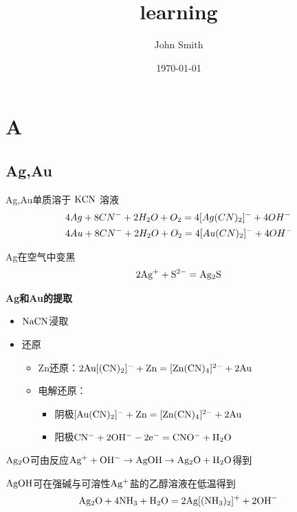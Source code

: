 \documentclass[UTF8]{article}
\title{learning}
\author{John Smith}
\date{\today}
\begin{document}
\section{A}

\subsection{Ag,Au}

Ag,Au单质溶于 $ \rm K CN$ 溶液
\begin{equation}
    \begin{aligned}
        \rm \nonumber
         & 4Ag+8 {CN}^{-} +2H_{2}O+O_{2} = 4[Ag(CN)_{2}]^{-} +4OH^{-} \\
         & 4Au+8 {CN}^{-} +2H_{2}O+O_{2} = 4[Au(CN)_{2}]^{-} +4OH^{-}
    \end{aligned}
\end{equation}

Ag在空气中变黑
\begin{equation}
    \begin{aligned}
        \rm \nonumber
        2Ag^{+}+S^{2-} = Ag_{2}S
    \end{aligned}
\end{equation}

\textbf{Ag和Au的提取}
\begin{itemize}[leftmargin=50pt]
    \setlength{\itemsep}{0pt}
    \setlength{\parsep}{0pt}
    \setlength{\parskip}{0pt}
    \item $ \rm NaCN $浸取
    \item 还原
          \begin{itemize}
              \item[] Zn还原：$\rm 2Au[(CN)_{2}]^{-}+Zn=[Zn(CN)_{4}]^{2-}+2Au$
              \item[] 电解还原：
                  \begin{itemize}
                      \item[] 阴极$\rm [Au(CN)_{2}]^{-} +Zn = [Zn(CN)_{4}]^{2-}+2Au$
                      \item[] 阳极$\rm CN^{-}+2OH^{-} -2e^{-} = CNO^{-}+H_{2}O$
                  \end{itemize}
          \end{itemize}
\end{itemize}

$\rm Ag_{2}O$可由反应$\rm Ag^{+}+OH^{-} \rightarrow AgOH \rightarrow Ag_{2}O + H_{2}O$得到

$\rm AgOH$可在强碱与可溶性$\rm Ag^{+}$盐的乙醇溶液在低温得到
\[
    \rm Ag_{2}O+4NH_{3}+H_{2}O = 2Ag[(NH_{3})_{2}]^{+}+2OH^{-}
\]
\end{document}
